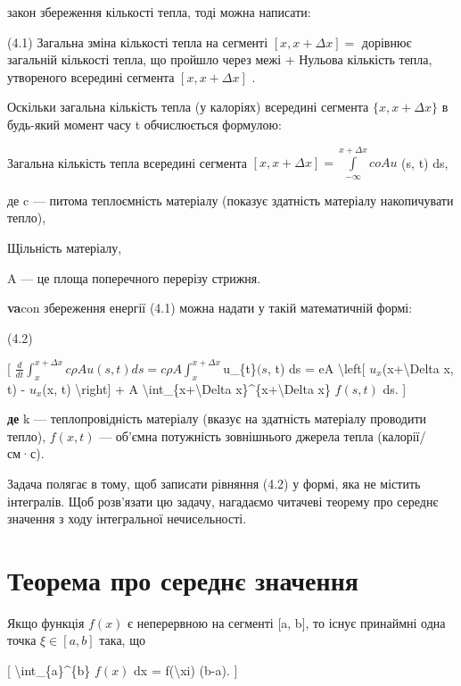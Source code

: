 \documentclass[
]{article}
\begin{document}
закон збереження кількості тепла, тоді можна написати:

(4.1) Загальна зміна кількості тепла на сегменті \([x, x + \Delta x] =\)
дорівнює загальній кількості тепла, що пройшло через межі + Нульова
кількість тепла, утвореного всередині сегмента \([x, x + \Delta x]\) .

Оскільки загальна кількість тепла (у калоріях) всередині сегмента
\(\{x, x + \Delta x\}\) в будь-який момент часу t обчислюється формулою:

Загальна кількість тепла всередині сегмента
\([x, x+\Delta x] = \int\limits_{-\infty}^{x+\Delta x} coAu\) (s, t) ds,

де c --- питома теплоємність матеріалу (показує здатність матеріалу
накопичувати тепло),

Щільність матеріалу,

A --- це площа поперечного перерізу стрижня.

\textbf{va}con збереження енергії (4.1) можна надати у такій
математичній формі:

(4.2)

{[}
\(\frac{d}{dt} \int_{x}^{x+\Delta x} c\rho Au(s, t) ds = c\rho A \int_{x}^{x+\Delta x}\)u\_\{t\}\((s\),
t) ds = eA \textbackslash left{[} \(u_{x}\)(x+\textbackslash Delta x, t)
- \(u_{x}\)(x, t) \textbackslash right{]} + A
\textbackslash int\_\{x+\textbackslash Delta
x\}\^{}\{x+\textbackslash Delta x\} \(f(s, t)\) ds. {]}

\textbf{де} k --- теплопровідність матеріалу (вказує на здатність
матеріалу проводити тепло), \(f(x, t)\) --- об'ємна потужність
зовнішнього джерела тепла (калорії/см·с).

Задача полягає в тому, щоб записати рівняння (4.2) у формі, яка не
містить інтегралів. Щоб розв'язати цю задачу, нагадаємо читачеві теорему
про середнє значення з ходу інтегральної нечисельності.

\section{Теорема про середнє
значення}\label{ux442ux435ux43eux440ux435ux43cux430-ux43fux440ux43e-ux441ux435ux440ux435ux434ux43dux454-ux437ux43dux430ux447ux435ux43dux43dux44f}

Якщо функція \(f(x)\) є неперервною на сегменті {[}a, b{]}, то існує
принаймні одна точка \(\xi \in [a, b]\) така, що

{[} \textbackslash int\_\{a\}\^{}\{b\} \(f(x)\) dx =
f(\textbackslash xi) (b-a). {]}
\end{document}

